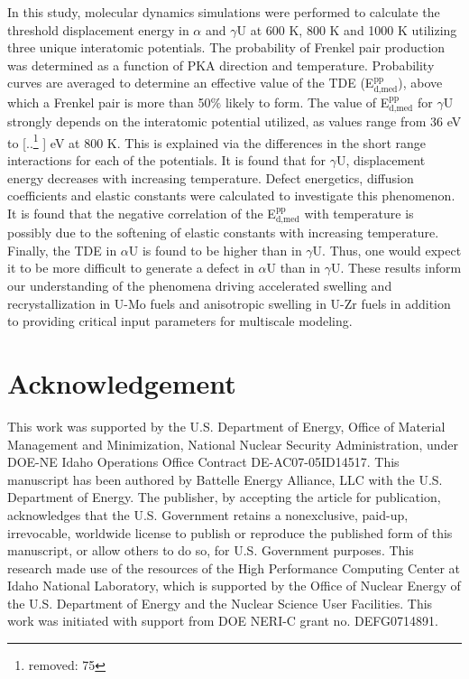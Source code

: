\documentclass[review]{elsarticle}
\providecommand{\DIFaddtex}[1]{{\protect\color{blue} \sf #1}} %
\providecommand{\DIFdeltex}[1]{{\protect\color{red} [..\footnote{removed: #1} ]}} %
\providecommand{\DIFaddbegin}{} %
\providecommand{\DIFaddend}{} %
\providecommand{\DIFdelbegin}{} %
\providecommand{\DIFdelend}{} %
\providecommand{\DIFadd}[1]{\texorpdfstring{\DIFaddtex{#1}}{#1}} %
\providecommand{\DIFdel}[1]{\texorpdfstring{\DIFdeltex{#1}}{}} %
\newcommand{\DIFscaledelfig}{0.5}
\newlength{\DIFdelgraphicswidth} %
\newlength{\DIFdelgraphicsheight} %
\newcommand{\DIFaddincludegraphics}[2][]{{\color{blue}\fbox{\DIFOincludegraphics[#1]{#2}}}} %
\newcommand{\DIFdelincludegraphics}[2][]{%
\sbox{\DIFdelgraphicsbox}{\DIFOincludegraphics[#1]{#2}}%
\settoboxwidth{\DIFdelgraphicswidth}{\DIFdelgraphicsbox} %
\settoboxtotalheight{\DIFdelgraphicsheight}{\DIFdelgraphicsbox} %
\scalebox{\DIFscaledelfig}{%
\parbox[b]{\DIFdelgraphicswidth}{\usebox{\DIFdelgraphicsbox}\\[-\baselineskip] \rule{\DIFdelgraphicswidth}{0em}}\llap{\resizebox{\DIFdelgraphicswidth}{\DIFdelgraphicsheight}{%
\setlength{\unitlength}{\DIFdelgraphicswidth}%
\begin{picture}(1,1)%
\thicklines\linethickness{2pt} %
{\color[rgb]{1,0,0}\put(0,0){\framebox(1,1){}}}%
{\color[rgb]{1,0,0}\put(0,0){\line( 1,1){1}}}%
{\color[rgb]{1,0,0}\put(0,1){\line(1,-1){1}}}%
\end{picture}%
}\hspace*{3pt}}} %
} %
\DeclareRobustCommand{\DIFaddbegin}{\DIFOaddbegin \let\includegraphics\DIFaddincludegraphics} %
\DeclareRobustCommand{\DIFaddend}{\DIFOaddend \let\includegraphics\DIFOincludegraphics} %
\DeclareRobustCommand{\DIFdelbegin}{\DIFOdelbegin \let\includegraphics\DIFdelincludegraphics} %
\DeclareRobustCommand{\DIFdelend}{\DIFOaddend \let\includegraphics\DIFOincludegraphics} %
\begin{document}
In this study, molecular dynamics simulations were performed to calculate the threshold displacement energy in $\alpha$ and $\gamma$U at 600 K, 800 K and 1000 K utilizing three unique interatomic potentials. The probability of Frenkel pair production was determined as a function of PKA direction and temperature. Probability curves are averaged to determine an effective value of the TDE (E$^{\textrm{pp}}_{\textrm{d,med}}$), above which a Frenkel pair is more than 50$\%$ likely to form. The value of E$^{\textrm{pp}}_{\textrm{d,med}}$ for $\gamma$U strongly depends on the interatomic potential utilized, as values range from 36 eV to \DIFdelbegin \DIFdel{75 }\DIFdelend \DIFaddbegin \DIFadd{73 }\DIFaddend eV at 800 K. This is explained via the differences in the short range interactions for each of the potentials. It is found that for $\gamma$U, displacement energy decreases with increasing temperature. Defect energetics, diffusion coefficients and elastic constants were calculated to investigate this phenomenon. It is found that the negative correlation of the E$^{\textrm{pp}}_{\textrm{d,med}}$ with temperature is possibly due to the softening of elastic constants with increasing temperature. Finally, the TDE in $\alpha$U is found to be higher than in $\gamma$U. Thus, one would expect it to be more difficult to generate a defect in $\alpha$U than in $\gamma$U. These results inform our understanding of the phenomena driving accelerated swelling and recrystallization in U-Mo fuels and anisotropic swelling in U-Zr fuels in addition to providing critical input parameters for multiscale modeling.

\section{Acknowledgement}
This work was supported by the U.S. Department of Energy, Office of Material Management and Minimization, National Nuclear Security Administration, under DOE-NE Idaho Operations Office Contract DE-AC07-05ID14517. This manuscript has been authored by Battelle Energy Alliance, LLC with the U.S. Department of Energy. The publisher, by accepting the article for publication, acknowledges that the U.S. Government retains a nonexclusive, paid-up, irrevocable, worldwide license to publish or reproduce the published form of this manuscript, or allow others to do so, for U.S. Government purposes. This research made use of the resources of the High Performance Computing Center at Idaho National Laboratory, which is supported by the Office of Nuclear Energy of the U.S. Department of Energy and the Nuclear Science User Facilities. This work was initiated with support from DOE NERI-C grant no. DEFG0714891.
\end{document}
